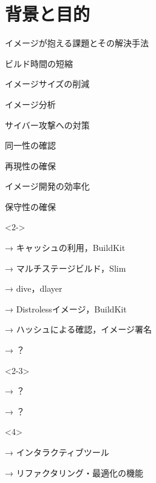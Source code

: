 \section{背景と目的}

\begin{frame}{イメージが抱える課題とその解決手法}
    \begin{multicols}{2}
        \begin{list}{}{\setlength{\itemsep}{1.0zh}}
            \setlength{\itemindent}{-3.0zw}
            \item ビルド時間の短縮
            \item イメージサイズの削減
            \item イメージ分析
            \item サイバー攻撃への対策
            \item 同一性の確認
            \item 再現性の確保
            \item イメージ開発の効率化
            \item 保守性の確保
        \columnbreak
        \setlength{\itemindent}{-4.6zw}
            \begin{onlyenv}<2->
                \item[→] キャッシュの利用，BuildKit
                \item[→] マルチステージビルド，Slim
                \item[→] dive，dlayer
                \item[→] Distrolessイメージ，BuildKit
                \item[→] ハッシュによる確認，イメージ署名
                \item[→] ？
            \end{onlyenv}
            \begin{onlyenv}<2-3>
                \item[→] ？
                \item[→] ？
            \end{onlyenv}
            \begin{onlyenv}<4>
                \item[→] \textcolor{red!75}{インタラクティブツール}
                \item[→] \textcolor{red!75}{リファクタリング・最適化の機能}
            \end{onlyenv}
        \end{list}
    \end{multicols}


\end{frame}
